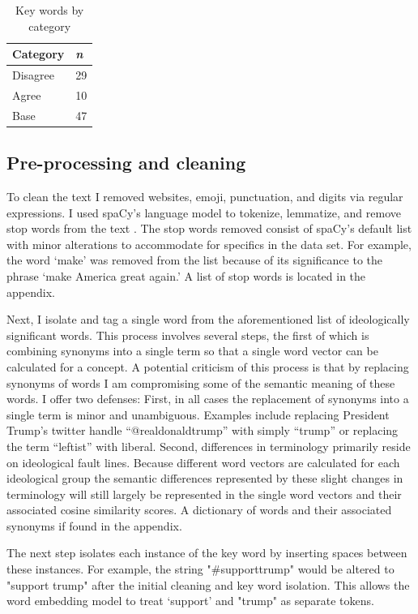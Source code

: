 \documentclass[../embeddings.tex]{subfiles}
\begin{document}
\begin{table}[h]
 \caption{Key words by category}
  \centering
  \begin{tabular}{ll}
    \toprule
    Category      & \textit{n}\\
    \midrule
    Disagree  &   29\\
    Agree     &   10\\
    Base      &   47\\
    \bottomrule
  \end{tabular}
  \label{tab:table}
\end{table}


\subsection{Pre-processing and cleaning}
To clean the text I removed websites, emoji, punctuation, and digits via regular expressions. I used spaCy’s language model to tokenize, lemmatize, and remove stop words from the text \cite{honnibal-johnson:2015:EMNLP}. The stop words removed consist of spaCy’s default list with minor alterations to accommodate for specifics in the data set. For example, the word ‘make’ was removed from the list because of its significance to the phrase ‘make America great again.’ A list of stop words is located in the appendix.

Next, I isolate and tag a single word from the aforementioned list of ideologically significant words. This process involves several steps, the first of which is combining synonyms into a single term so that a single word vector can be calculated for a concept. A potential criticism of this process is that by replacing synonyms of words I am compromising some of the semantic meaning of these words. I offer two defenses: First, in all cases the replacement of synonyms into a single term is minor and unambiguous. Examples include replacing President Trump’s twitter handle “@realdonaldtrump” with simply “trump” or replacing the term “leftist” with liberal. Second, differences in terminology primarily reside on ideological fault lines. Because different word vectors are calculated for each ideological group the semantic differences represented by these slight changes in terminology will still largely be represented in the single word vectors and their associated cosine similarity scores. A dictionary of words and their associated synonyms if found in the appendix.

The next step isolates each instance of the key word by inserting spaces between these instances. For example, the string "\#supporttrump" would be altered to "support trump" after the initial cleaning and key word isolation. This allows the word embedding model to treat ‘support’ and "trump" as separate tokens. 
\end{document}
